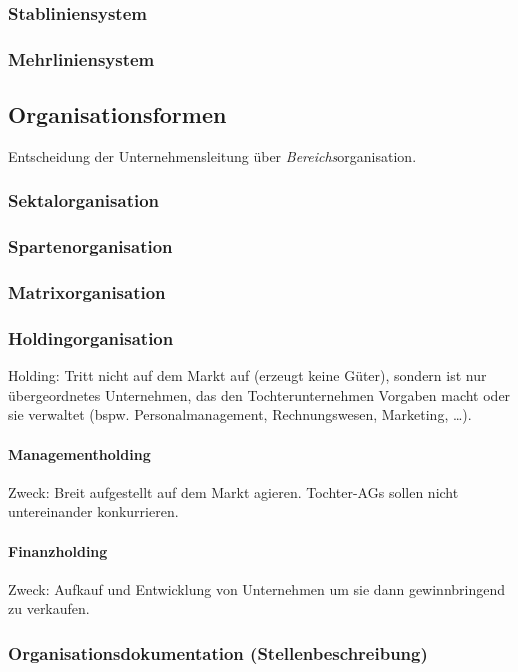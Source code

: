 \subsubsection{Stabliniensystem}
\subsubsection{Mehrliniensystem}

\subsection{Organisationsformen}
Entscheidung der Unternehmensleitung über \emph{Bereichs}organisation.
\subsubsection{Sektalorganisation}
\subsubsection{Spartenorganisation}
\subsubsection{Matrixorganisation}
\subsubsection{Holdingorganisation}
Holding: Tritt nicht auf dem Markt auf (erzeugt keine Güter), sondern ist nur übergeordnetes Unternehmen, das den Tochterunternehmen Vorgaben macht oder sie verwaltet (bspw. Personalmanagement, Rechnungswesen, Marketing, …). 
\paragraph{Managementholding} Zweck: Breit aufgestellt auf dem Markt agieren. Tochter-AGs sollen nicht untereinander konkurrieren.
\paragraph{Finanzholding}
Zweck: Aufkauf und Entwicklung von Unternehmen um sie dann gewinnbringend zu verkaufen.
\subsubsection{Organisationsdokumentation (Stellenbeschreibung)}

